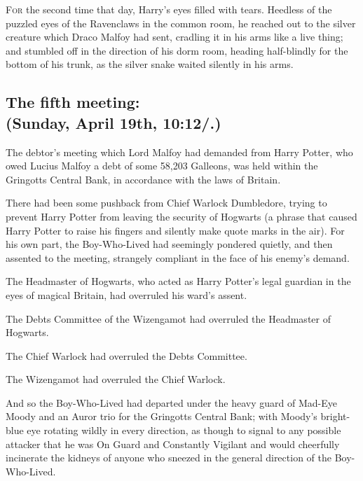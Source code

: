 

\lettrine{F}{or} the second
time that day, Harry's eyes filled with tears. Heedless of the puzzled eyes of
the Ravenclaws in the common room, he reached out to the silver creature which
Draco Malfoy had sent, cradling it in his arms like a live thing; and stumbled
off in the direction of his dorm room, heading half-blindly for the bottom of
his trunk, as the silver snake waited silently in his arms.
\sbreak
\subsection{The fifth meeting:\\
(Sunday, April 19th, 10:12\AM/.)}

The debtor's meeting which Lord Malfoy had demanded from Harry Potter, who owed
Lucius Malfoy a debt of some 58,203 Galleons, was held within the Gringotts
Central Bank, in accordance with the laws of Britain.

There had been some pushback from Chief Warlock Dumbledore, trying to prevent
Harry Potter from leaving the security of Hogwarts (a phrase that caused Harry
Potter to raise his fingers and silently make quote marks in the air). For his
own part, the Boy-Who-Lived had seemingly pondered quietly, and then assented
to the meeting, strangely compliant in the face of his enemy's demand.

The Headmaster of Hogwarts, who acted as Harry Potter's legal guardian in the
eyes of magical Britain, had overruled his ward's assent.

The Debts Committee of the Wizengamot had overruled the Headmaster of Hogwarts.

The Chief Warlock had overruled the Debts Committee.

The Wizengamot had overruled the Chief Warlock.

And so the Boy-Who-Lived had departed under the heavy guard of Mad-Eye Moody
and an Auror trio for the Gringotts Central Bank; with Moody's bright-blue eye
rotating wildly in every direction, as though to signal to any possible
attacker that he was On Guard and Constantly Vigilant and would cheerfully
incinerate the kidneys of anyone who sneezed in the general direction of the
Boy-Who-Lived.

